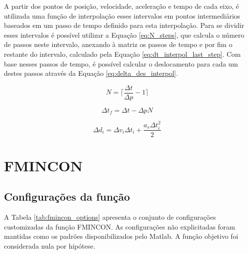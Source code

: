 A partir dos pontos de posição, velocidade, aceleração e tempo de cada eixo, é utilizada uma função de interpolação esses intervalos em pontos intermediários baseados em um passo de tempo definido para esta interpolação. Para se dividir esses intervalos é possível utilizar a Equação \ref{eq:N_steps}, que calcula o número de passos neste intervalo, anexando à matriz os passos de tempo e por fim
o restante do intervalo, calculado pela Equação \ref{eq:dt_interpol_last_step}. Com base nesses passos de tempo, é possível calcular o deslocamento para cada um destes passos através da Equação \ref{eq:delta_des_interpol}.

\begin{equation}
    \label{eq:N_steps}
    N = \lceil\frac{\Delta t}{\Delta p}-1\rceil
\end{equation}

\begin{equation}
    \label{eq:dt_interpol_last_step}
    \Delta t_f= \Delta t - \Delta p N 
\end{equation}

\begin{equation}
    \label{eq:delta_des_interpol}
    \Delta d_i = \Delta v_i \Delta t_i+ \frac{a_s \Delta t_i^2}{2} 
\end{equation}



\section{FMINCON}

\subsection{Configurações da função}

A Tabela \ref{tab:fmincon_options} apresenta o conjunto de configurações customizadas da função FMINCON. As configurações não explicitadas foram mantidas como os padrões disponibilizados pelo Matlab. A função objetivo foi considerada nula por hipótese.

